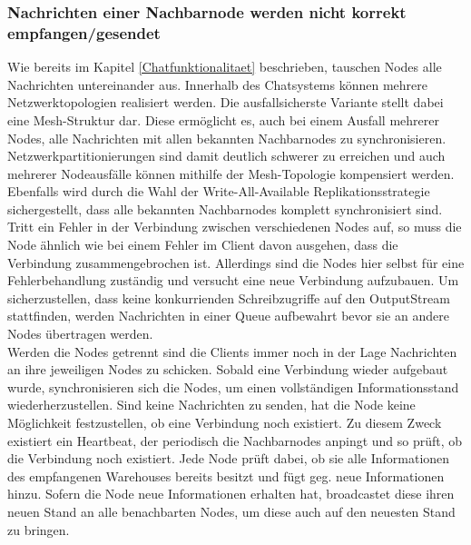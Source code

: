 \subsubsection*{Nachrichten einer Nachbarnode werden nicht korrekt empfangen/gesendet}
Wie bereits im Kapitel \ref{Chatfunktionalitaet} beschrieben, tauschen Nodes alle Nachrichten untereinander aus. Innerhalb des Chatsystems können mehrere
Netzwerktopologien realisiert werden. Die ausfallsicherste Variante stellt dabei eine Mesh-Struktur dar. 
Diese ermöglicht es, auch bei einem Ausfall mehrerer Nodes, alle Nachrichten mit allen bekannten Nachbarnodes zu synchronisieren. Netzwerkpartitionierungen sind damit
deutlich schwerer zu erreichen und auch mehrerer Nodeausfälle können mithilfe der Mesh-Topologie kompensiert werden. Ebenfalls wird durch die Wahl der
Write-All-Available Replikationsstrategie sichergestellt, dass alle bekannten Nachbarnodes komplett synchronisiert sind.
\\
Tritt ein Fehler in der Verbindung zwischen verschiedenen Nodes auf, so muss die Node ähnlich wie bei einem Fehler im Client davon ausgehen, 
dass die Verbindung zusammengebrochen ist. Allerdings sind die Nodes hier selbst für eine Fehlerbehandlung zuständig und versucht eine neue
Verbindung aufzubauen. Um sicherzustellen, dass keine konkurrienden Schreibzugriffe auf den OutputStream stattfinden,
werden Nachrichten in einer Queue aufbewahrt bevor sie an andere Nodes übertragen werden.
\\
Werden die Nodes getrennt sind die Clients immer noch in der Lage Nachrichten an ihre jeweiligen Nodes zu schicken.
Sobald eine Verbindung wieder aufgebaut wurde, synchronisieren sich die Nodes, um einen vollständigen Informationsstand wiederherzustellen.
Sind keine Nachrichten zu senden, hat die Node keine Möglichkeit festzustellen, ob eine Verbindung noch existiert. 
Zu diesem Zweck existiert ein Heartbeat, der periodisch die Nachbarnodes anpingt und so prüft, ob die Verbindung noch existiert.
Jede Node prüft dabei, 
ob sie alle Informationen des empfangenen Warehouses bereits besitzt und fügt geg. neue Informationen hinzu. 
Sofern die Node neue Informationen erhalten hat, broadcastet diese ihren neuen Stand an alle benachbarten Nodes,
um diese auch auf den neuesten Stand zu bringen.



